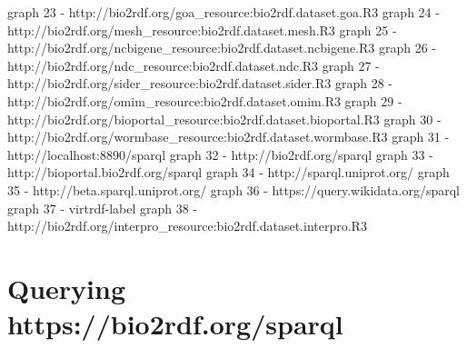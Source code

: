 \documentclass[a4paper,12pt]{article}
\begin{document}
\newline
graph 23 - http://bio2rdf.org/goa\_resource:bio2rdf.dataset.goa.R3 
\newline
graph 24 - http://bio2rdf.org/mesh\_resource:bio2rdf.dataset.mesh.R3 
\newline
graph 25 - http://bio2rdf.org/ncbigene\_resource:bio2rdf.dataset.ncbigene.R3 
\newline
graph 26 - http://bio2rdf.org/ndc\_resource:bio2rdf.dataset.ndc.R3 
\newline
graph 27 - http://bio2rdf.org/sider\_resource:bio2rdf.dataset.sider.R3 
\newline
graph 28 - http://bio2rdf.org/omim\_resource:bio2rdf.dataset.omim.R3 
\newline
graph 29 - http://bio2rdf.org/bioportal\_resource:bio2rdf.dataset.bioportal.R3 
\newline
graph 30 - http://bio2rdf.org/wormbase\_resource:bio2rdf.dataset.wormbase.R3 
\newline
graph 31 - http://localhost:8890/sparql 
\newline
graph 32 - http://bio2rdf.org/sparql 
\newline
graph 33 - http://bioportal.bio2rdf.org/sparql 
\newline
graph 34 - http://sparql.uniprot.org/ 
\newline
graph 35 - http://beta.sparql.uniprot.org/ 
\newline
graph 36 - https://query.wikidata.org/sparql 
\newline
graph 37 - virtrdf-label 
\newline
graph 38 - http://bio2rdf.org/interpro\_resource:bio2rdf.dataset.interpro.R3 
\newline
\newpage
\section{Querying https://bio2rdf.org/sparql}
\end{document}
